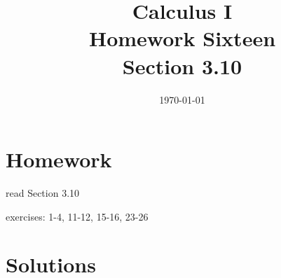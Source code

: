 \documentclass[letterpaper]{exam}
\title{Calculus I \\ Homework Sixteen \\ Section 3.10}
\author{}
\date{\today}
\begin{document}
  \maketitle

  \section{Homework}
    \begin{itemize*}
      \item read Section 3.10
      \item exercises: 1-4, 11-12, 15-16, 23-26
    \end{itemize*}

  \ifprintanswers

  \section{Solutions}
\end{document}
